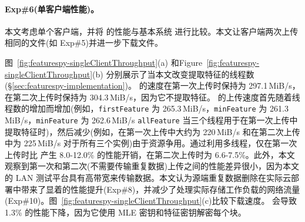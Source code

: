 \paragraph*{Exp\#6(单客户端性能)。}
本文考虑单个客户端，并将 \prototype 的性能与基本系统 \sysnameS 进行比较。本文让客户端两次上传相同的文件(如 Exp\#5)并进一步下载文件。


图~\ref{fig:featurespy-singleClientThroughput}(a) 和Figure~\ref{fig:featurespy-singleClientThroughput}(b) 分别展示了当本文改变提取特征的线程数(\S\ref{sec:featurespy-implementation})。 \sysnameS 的速度在第一次上传时保持为 297.1\,MiB/s，在第二次上传时保持为 304.3\,MiB/s，因为它不提取特征。 \prototype 的上传速度首先随着线程数的增加而增加(例如，{\tt firstFeature} 为 265.3\,MiB/s，{\tt minFeature} 为 261.3\,MiB/s，{\tt minFeature} 为 262.6\,MiB/s {\tt allFeature} 当三个线程用于在第一次上传中提取特征时)，然后减少(例如，在第一次上传中大约为 220\,MiB/s 和在第二次上传中为 225\,MiB/s 对于所有三个实例)由于资源争用。通过利用多线程，\prototype 仅在第一次上传时比 \sysnameS 产生 8.0-12.0\% 的性能开销，在第二次上传时为 6.6-7.5\%。此外，本文观察到第一次和第二次(不需要传输重复数据)上传之间的性能差异很小，因为本文的 LAN 测试平台具有高带宽来传输数据。本文认为源端重复数据删除在实际云部署中带来了显着的性能提升(Exp\#8)，并减少了处理实际存储工作负载的网络流量(Exp\#10)。图~\ref{fig:featurespy-singleClientThroughput}(c)比较下载速度。 \prototype 会导致 1.3\% 的性能下降，因为它使用 MLE 密钥和特征密钥解密每个块。



